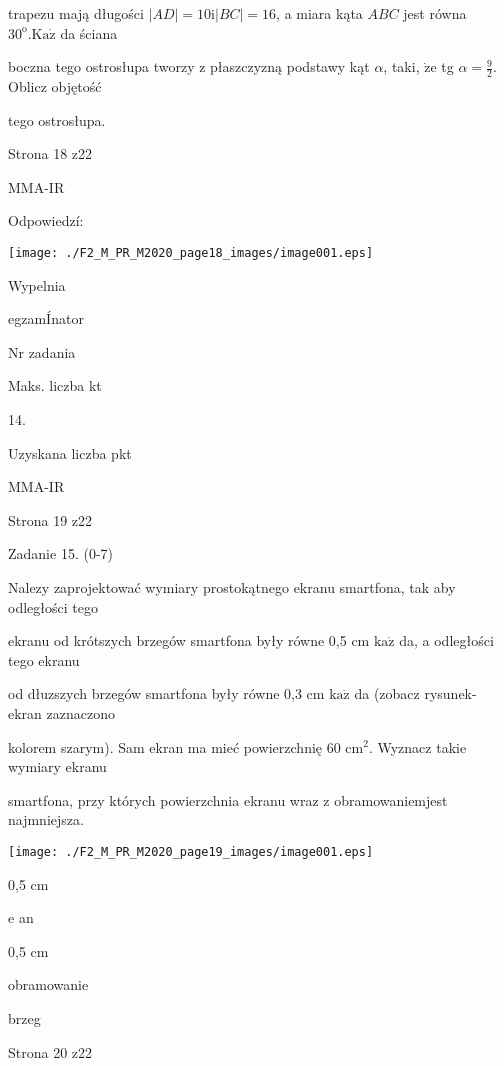 \documentclass[a4paper,12pt]{article}
\begin{document}
trapezu mają długości $|AD|=10 \mathrm{i}|BC|=16$, a miara kąta $ABC$ jest równa $30^{\mathrm{o}}. \mathrm{K}\mathrm{a}\dot{\mathrm{z}}$ da ściana

boczna tego ostrosłupa tworzy z płaszczyzną podstawy kąt $\alpha$, taki, $\dot{\mathrm{z}}\mathrm{e}$ tg $\displaystyle \alpha=\frac{9}{2}$. Oblicz objętość

tego ostrosłupa.

Strona 18 z22

MMA-IR





Odpowiedzí:
\begin{center}
\texttt{[image: ./F2\_M\_PR\_M2020\_page18\_images/image001.eps]}
\end{center}
Wypelnia

egzamÍnator

Nr zadania

Maks. liczba kt

14.

Uzyskana liczba pkt

MMA-IR

Strona 19 z22





Zadanie 15. (0-7)

Nalez$\mathrm{y}$ zaprojektować wymiary prostokątnego ekranu smartfona, tak aby odległości tego

ekranu od krótszych brzegów smartfona były równe 0,5 cm $\mathrm{k}\mathrm{a}\dot{\mathrm{z}}$ da, a odległości tego ekranu

od dłuzszych brzegów smartfona były równe 0,3 cm $\mathrm{k}\mathrm{a}\dot{\mathrm{z}}$ da (zobacz rysunek- ekran zaznaczono

kolorem szarym). Sam ekran ma mieć powierzchnię 60 $\mathrm{c}\mathrm{m}^{2}$. Wyznacz takie wymiary ekranu

smartfona, przy których powierzchnia ekranu wraz z obramowaniemjest najmniejsza.
\begin{center}
\texttt{[image: ./F2\_M\_PR\_M2020\_page19\_images/image001.eps]}
\end{center}
0,5 cm

e an

0,5 cm

obramowanie

brzeg

Strona 20 z22
\end{document}
